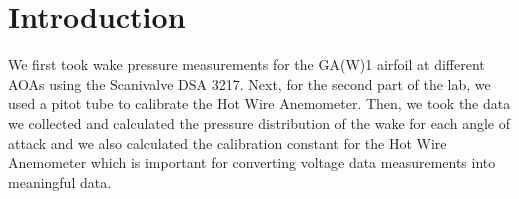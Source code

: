 \chapter{Introduction}
\label{cp:introduction}
We first took wake pressure measurements for the GA(W)1 airfoil at different AOAs using the Scanivalve DSA 3217. Next, for the second part of the lab, we used a pitot tube to calibrate the Hot Wire Anemometer. Then, we took the data we collected and calculated the pressure distribution of the wake for each angle of attack and we also calculated the calibration constant for the Hot Wire Anemometer which is important for converting voltage data measurements into meaningful data.